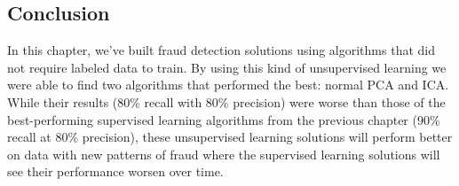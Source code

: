 \documentclass[11pt]{article}
\begin{document}
    \subsection{Conclusion}\label{conclusion}

    In this chapter, we've built fraud detection solutions using algorithms
that did not require labeled data to train. By using this kind of
unsupervised learning we were able to find two algorithms that performed
the best: normal PCA and ICA. While their results (80\% recall with 80\%
precision) were worse than those of the best-performing supervised
learning algorithms from the previous chapter (90\% recall at 80\%
precision), these unsupervised learning solutions will perform better on
data with new patterns of fraud where the supervised learning solutions
will see their performance worsen over time.


    
    
    
    
\end{document}
